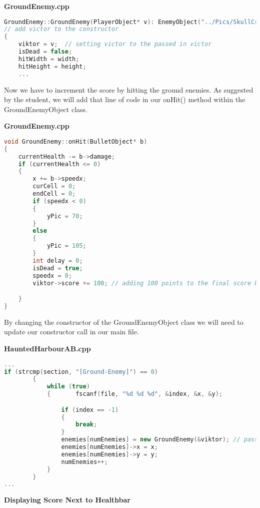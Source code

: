 \documentclass[11pt]{article}
\begin{document}
\bigskip
\textbf{GroundEnemy.cpp}
\smallskip 

\begin{lstlisting}[language=C++]  
GroundEnemy::GroundEnemy(PlayerObject* v): EnemyObject("../Pics/SkullCrab.bmp", 200, 200) 
// add victor to the constructor
{
	viktor = v;  // setting victor to the passed in victor
	isDead = false;
	hitWidth = width;
	hitHeight = height;
	...
\end{lstlisting}   

Now we have to increment the score by hitting the ground enemies. As suggested by the student, we will add that line of code in our onHit() method within the GroundEnemyObject class. 

\bigskip
\textbf{GroundEnemy.cpp}
\smallskip 

\begin{lstlisting}[language=C++]  
void GroundEnemy::onHit(BulletObject* b)
{
	currentHealth -= b->damage;
	if (currentHealth <= 0)
	{
		x += b->speedx;
		curCell = 0;
		endCell = 0;
		if (speedx < 0)
		{
			yPic = 70;
		}
		else
		{
			yPic = 105;
		}
		int delay = 0;
		isDead = true;
		speedx = 0;
		viktor->score += 100; // adding 100 points to the final score by destroying ground enemy. 

	}
}
\end{lstlisting}    

By changing the constructor of the GroundEnemyObject class we will need to update our constructor call in our main file. 

\bigskip
\textbf{HauntedHarbourAB.cpp}
\smallskip 

\begin{lstlisting}[language=C++]  
... 
if (strcmp(section, "[Ground-Enemy]") == 0)
		{
			while (true)
			{		fscanf(file, "%d %d %d", &index, &x, &y);

				if (index == -1)
				{
					break;
				}
				enemies[numEnemies] = new GroundEnemy(&viktor); // passing in victor into the new constructor
				enemies[numEnemies]->x = x;
				enemies[numEnemies]->y = y;
				numEnemies++;
			}
		}  
...
\end{lstlisting}  

\bigskip 
\clearpage

\begin{center}
\textbf{Displaying Score Next to Healthbar}
\end{center}  
\end{document}
